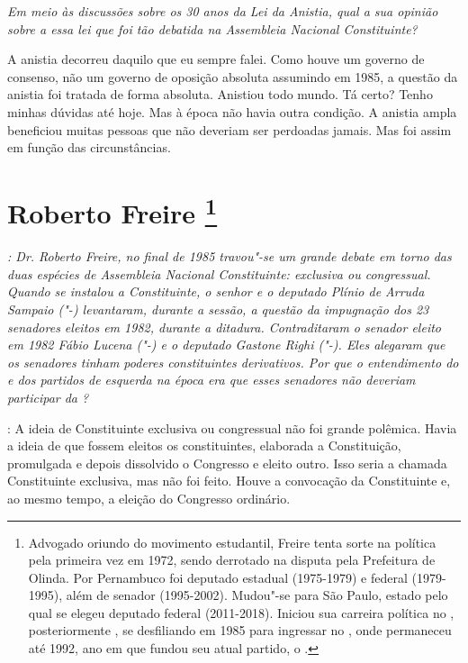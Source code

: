 \medskip

\noindent\emph{Em meio às discussões sobre os 30 anos da Lei da Anistia, qual a
sua opinião sobre a essa lei que foi tão debatida na Assembleia Nacional
Constituinte?}

A anistia decorreu daquilo que eu sempre falei. Como
houve um governo de consenso, não um governo de oposição absoluta
assumindo em 1985, a questão da anistia foi tratada de forma absoluta.
Anistiou todo mundo. Tá certo? Tenho minhas dúvidas até hoje. Mas à
época não havia outra condição. A anistia ampla beneficiou muitas
pessoas que não deveriam ser perdoadas jamais. Mas foi assim em função
das circunstâncias.

\chapter{Roberto Freire
\footnote{Advogado oriundo do movimento estudantil, Freire tenta sorte na
política pela primeira vez em 1972, sendo derrotado na disputa pela
Prefeitura de Olinda. Por Pernambuco foi deputado estadual (1975-1979) e
federal (1979-1995), além de senador (1995-2002). Mudou"-se para São
Paulo, estado pelo qual se elegeu deputado federal (2011-2018). Iniciou
sua carreira política no , posteriormente , se desfiliando em
1985 para ingressar no , onde permaneceu até 1992, ano em que fundou
seu atual partido, o .}}

\emph{: Dr. Roberto Freire, no final de 1985 travou"-se um grande debate
em torno das duas espécies de Assembleia Nacional Constituinte:
exclusiva ou congressual. Quando se instalou a Constituinte, o senhor e
o deputado Plínio de Arruda Sampaio ("-) levantaram, durante a
sessão, a questão da impugnação dos 23 senadores eleitos em 1982,
durante a ditadura. Contraditaram o senador eleito em 1982 Fábio Lucena
("-) e o deputado Gastone Righi ("-). Eles alegaram que os
senadores tinham poderes constituintes derivativos. Por que o
entendimento do  e dos partidos de esquerda na época era que esses
senadores não deveriam participar da ?}

: A ideia de Constituinte exclusiva ou congressual não
foi grande polêmica. Havia a ideia de que fossem eleitos os
constituintes, elaborada a Constituição, promulgada e depois dissolvido
o Congresso e eleito outro. Isso seria a chamada Constituinte exclusiva,
mas não foi feito. Houve a convocação da Constituinte e, ao mesmo tempo,
a eleição do Congresso ordinário.

